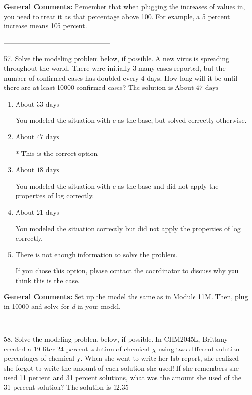 \documentclass{extbook}[14pt]
\begin{document}
\textbf{General Comments:} Remember that when plugging the increases of values in, you need to treat it as that percentage above 100. For example, a 5 percent increase means 105 percent.

-----------------------------------------------

57. Solve the modeling problem below, if possible.
A new virus is spreading throughout the world. There were initially 3 many cases reported, but the number of confirmed cases has doubled every 4 days. How long will it be until there are at least 10000 confirmed cases? 
The solution is $ \text{About } 47 \text{ days} $ 

\begin{enumerate}[label=\Alph*.] 
\item $ \text{About } 33 \text{ days} $ 

 You modeled the situation with $e$ as the base, but solved correctly otherwise. 
\item $ \text{About } 47 \text{ days} $ 

 * This is the correct option. 
\item $ \text{About } 18 \text{ days} $ 

 You modeled the situation with $e$ as the base and did not apply the properties of log correctly. 
\item $ \text{About } 21 \text{ days} $ 

 You modeled the situation correctly but did not apply the properties of log correctly. 
\item $ \text{There is not enough information to solve the problem.} $ 

 If you chose this option, please contact the coordinator to discuss why you think this is the case. 
\end{enumerate} 
 
\textbf{General Comments:} Set up the model the same as in Module 11M. Then, plug in 10000 and solve for $d$ in your model.

-----------------------------------------------

58. Solve the modeling problem below, if possible.
In CHM2045L, Brittany created a 19 liter 24 percent solution of chemical $\chi$ using two different solution percentages of chemical $\chi$. When she went to write her lab report, she realized she forgot to write the amount of each solution she used! If she remembers she used 11 percent and 31 percent solutions, what was the amount she used of the 31 percent solution? 
The solution is $ 12.35 $ 
\end{document}
